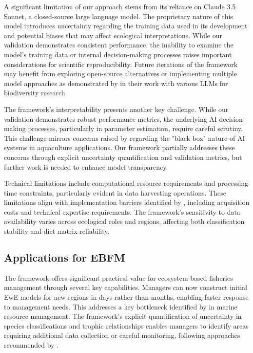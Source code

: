 A significant limitation of our approach stems from its reliance on Claude 3.5 Sonnet, a closed-source large language model. The proprietary nature of this model introduces uncertainty regarding the training data used in its development and potential biases that may affect ecological interpretations. While our validation demonstrates consistent performance, the inability to examine the model's training data or internal decision-making processes raises important considerations for scientific reproducibility. Future iterations of the framework may benefit from exploring open-source alternatives or implementing multiple model approaches as demonstrated by \cite{Kommineni2024} in their work with various LLMs for biodiversity research.

The framework's interpretability presents another key challenge. While our validation demonstrates robust performance metrics, the underlying AI decision-making processes, particularly in parameter estimation, require careful scrutiny. This challenge mirrors concerns raised by \cite{Fernandes2024} regarding the "black box" nature of AI systems in aquaculture applications. Our framework partially addresses these concerns through explicit uncertainty quantification and validation metrics, but further work is needed to enhance model transparency.

Technical limitations include computational resource requirements and processing time constraints, particularly evident in data harvesting operations. These limitations align with implementation barriers identified by \cite{Fernandes2024}, including acquisition costs and technical expertise requirements. The framework's sensitivity to data availability varies across ecological roles and regions, affecting both classification stability and diet matrix reliability.

\subsection{Applications for EBFM}

The framework offers significant practical value for ecosystem-based fisheries management through several key capabilities. Managers can now construct initial EwE models for new regions in days rather than months, enabling faster response to management needs. This addresses a key bottleneck identified by \cite{Zheng2023} in marine resource management. The framework's explicit quantification of uncertainty in species classifications and trophic relationships enables managers to identify areas requiring additional data collection or careful monitoring, following approaches recommended by \cite{Kuhn2024}. 

